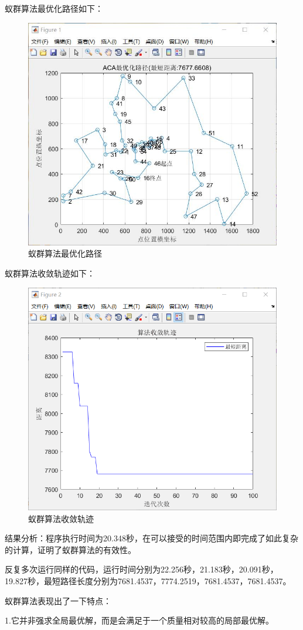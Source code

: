 \documentclass[UTF8]{ctexart}
\begin{document}
	蚁群算法最优化路径如下：
	\begin{figure}[H]
		\centering
		\includegraphics[width=0.7\linewidth]{蚁群算法最优化路径}
		\caption{蚁群算法最优化路径}
		\label{fig:}
	\end{figure}
	蚁群算法收敛轨迹如下：
	\begin{figure}[H]
		\centering
		\includegraphics[width=0.7\linewidth]{蚁群算法收敛轨迹}
		\caption{蚁群算法收敛轨迹}
		\label{fig:}
	\end{figure}
	
	结果分析：程序执行时间为20.348秒，在可以接受的时间范围内即完成了如此复杂的计算，证明了蚁群算法的有效性。
	
	反复多次运行同样的代码，运行时间分别为22.256秒，21.183秒，20.091秒，19.827秒，最短路径长度分别为7681.4537，7774.2519，7681.4537，7681.4537。
	
	蚁群算法表现出了一下特点：
	
	1.它并非强求全局最优解，而是会满足于一个质量相对较高的局部最优解。
	
\end{document}
